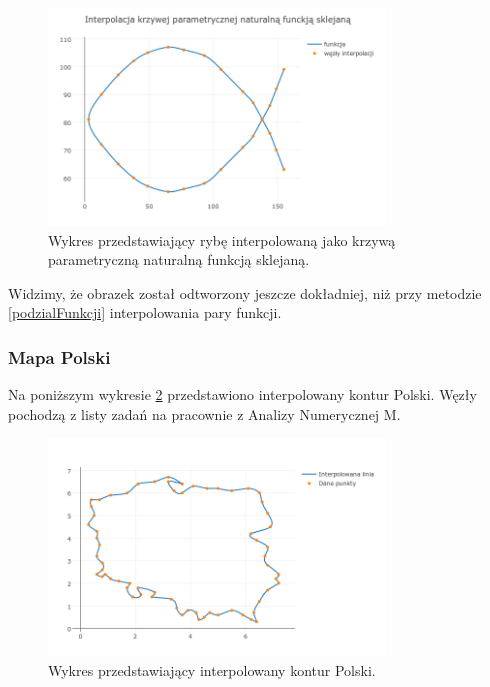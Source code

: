 \documentclass{article}
\begin{document}
	\begin{figure}[h]
		\centering
		\includegraphics[width=0.8\textwidth]{newplot(2).png}
		\caption{Wykres przedstawiający rybę interpolowaną jako krzywą parametryczną naturalną funkcją sklejaną.}
		\label{Wykres:Ryba_Sklejna}
	\end{figure}
	
	Widzimy, że obrazek został odtworzony jeszcze dokładniej, niż przy metodzie \ref{podzialFunkcji} interpolowania pary funkcji.
	
	 
	
	\subsubsection{Mapa Polski}
	
	Na poniższym wykresie \ref{Wykres:Polska} przedstawiono interpolowany kontur Polski. Węzły pochodzą z listy zadań na pracownie z Analizy Numerycznej M. 
	
	\newpage
	
		\begin{figure}[h]
			\centering
			\includegraphics[width=0.8\textwidth]{newplot(3).png}
			\caption{Wykres przedstawiający interpolowany kontur Polski.}
			\label{Wykres:Polska}
		\end{figure}
\end{document}
